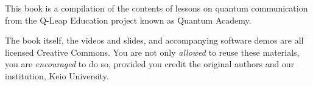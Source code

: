 
\begin{preface}
This book is a compilation of the contents of lessons on quantum communication from the Q-Leap Education project known as Quantum Academy.

The book itself, the videos and slides, and accompanying software demos are all licensed Creative Commons. You are not only \emph{allowed} to reuse these materials, you are \emph{encouraged} to do so, provided you credit the original authors and our institution, Keio University.

\author{Michal and Rodney}
\date{sometime in 2022}
\end{preface}

